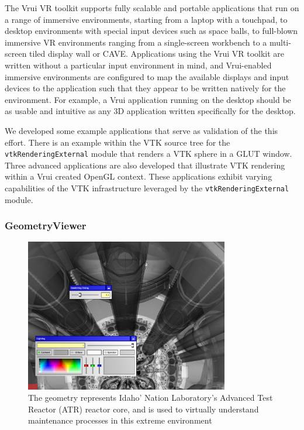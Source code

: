 The Vrui VR toolkit supports fully scalable and portable applications that run on a range of immersive environments, starting from a laptop with a touchpad, to desktop environments with special input devices such as space balls, to full-blown immersive VR environments ranging from a single-screen workbench to a multi-screen tiled display wall or CAVE. Applications using the Vrui VR toolkit are written without a particular input environment in mind, and Vrui-enabled immersive environments are configured to map the available displays and input devices to the application such that they appear to be written natively for the environment. For example, a Vrui application running on the desktop should be as usable and intuitive as any 3D application written specifically for the desktop.

We developed some example applications that serve as validation of the this effort. There is an example within the VTK source tree for the \texttt{vtkRenderingExternal} module that renders a VTK sphere in a GLUT window. Three advanced applications are also developed that illustrate VTK rendering within a Vrui created OpenGL context. These applications exhibit varying capabilities of the VTK infrastructure leveraged by the \texttt{vtkRenderingExternal} module. 

\subsubsection{GeometryViewer}

\begin{figure}[h!]
 \centering
 \includegraphics[width=3.5in]{images/vessel.png}
 \caption{The geometry represents Idaho' Nation Laboratory's Advanced Test Reactor (ATR) reactor core, and is used to virtually understand maintenance processes in this extreme environment}
 \label{fig:vessel}
\end{figure}

